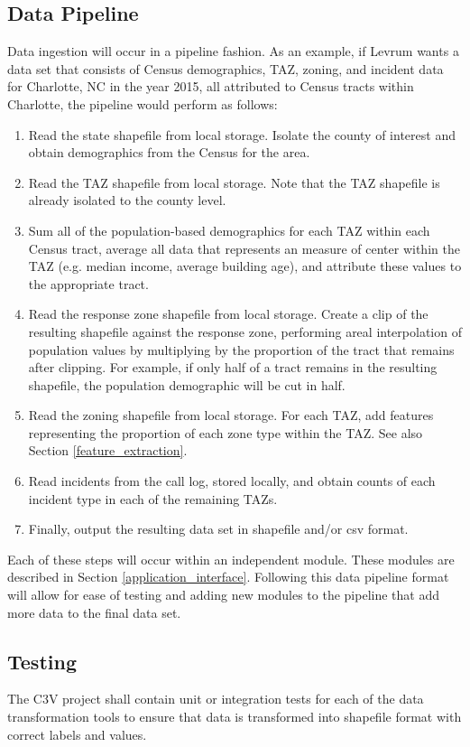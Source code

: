 \documentclass[onecolumn, draftclsnofoot,10pt, compsoc]{IEEEtran}
\begin{document}
\begin{singlespace}
    \subsection{Data Pipeline} \label{dtrans}
    Data ingestion will occur in a pipeline fashion. As an example, if Levrum wants a data set that consists of Census demographics, TAZ, zoning, and incident data for Charlotte, NC in the year 2015, all attributed to Census tracts within Charlotte, the pipeline would perform as follows: 
    \begin{enumerate}
        \item Read the state shapefile from local storage. Isolate the county of interest and obtain demographics from the Census for the area.
        \item Read the TAZ shapefile from local storage. Note that the TAZ shapefile is already isolated to the county level.
        \item Sum all of the population-based demographics for each TAZ within each Census tract, average all data that represents an measure of center within the TAZ (e.g. median income, average building age), and attribute these values to the appropriate tract.
        \item Read the response zone shapefile from local storage. Create a clip of the resulting shapefile against the response zone, performing areal interpolation of population values by multiplying by the proportion of the tract that remains after clipping. For example, if only half of a tract remains in the resulting shapefile, the population demographic will be cut in half.
        \item Read the zoning shapefile from local storage. For each TAZ, add features representing the proportion of each zone type within the TAZ. See also Section \ref{feature_extraction}.
        \item Read incidents from the call log, stored locally, and obtain counts of each incident type in each of the remaining TAZs. 
        \item Finally, output the resulting data set in shapefile and/or csv format.
    \end{enumerate}
    Each of these steps will occur within an independent module. These modules are described in Section \ref{application_interface}. 
    Following this data pipeline format will allow for ease of testing and adding new modules to the pipeline that add more data to the final data set. 

	\subsection{Testing} \label{ditesting}
	The C3V project shall contain unit or integration tests for each of the data transformation tools to ensure that data is transformed into shapefile format with correct labels and values.
	

\end{singlespace}
\end{document}
